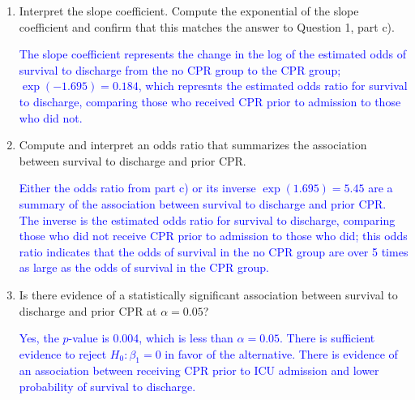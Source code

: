 \documentclass[letterpaper,12pt,twoside,]{pinp}
\begin{document}
\begin{enumerate}
  \newpage

  \begin{enumerate}
  \def\labelenumii{\alph{enumii})}
  \setcounter{enumii}{2}
  \item
    Interpret the slope coefficient. Compute the exponential of the
    slope coefficient and confirm that this matches the answer to
    Question 1, part c).

    \textcolor{blue}{The slope coefficient represents the change in the log of the estimated odds of survival to discharge from the no CPR group to the CPR group; $\exp(-1.695) = 0.184$, which represnts the estimated odds ratio for survival to discharge, comparing those who received CPR prior to admission to those who did not.}
  \item
    Compute and interpret an odds ratio that summarizes the association
    between survival to discharge and prior CPR.

    \textcolor{blue}{Either the odds ratio from part c) or its inverse $\exp(1.695) = 5.45$ are a summary of the association between survival to discharge and prior CPR. The inverse is the estimated odds ratio for survival to discharge, comparing those who did not receive CPR prior to admission to those who did; this odds ratio indicates that the odds of survival in the no CPR group are over 5 times as large as the odds of survival in the CPR group.}
  \item
    Is there evidence of a statistically significant association between
    survival to discharge and prior CPR at \(\alpha = 0.05\)?

    \textcolor{blue}{Yes, the $p$-value is 0.004, which is less than $\alpha = 0.05$. There is sufficient evidence to reject $H_0: \beta_1 = 0$ in favor of the alternative. There is evidence of an association between receiving CPR prior to ICU admission and lower probability of survival to discharge.}
  \end{enumerate}

\begin{Shaded}
\begin{Highlighting}[]
\NormalTok{(}\SpecialCharTok{\textasciitilde{}} \NormalTok{(} \NormalTok{)))}
\end{Highlighting}
\end{Shaded}


\end{enumerate}
\end{document}
